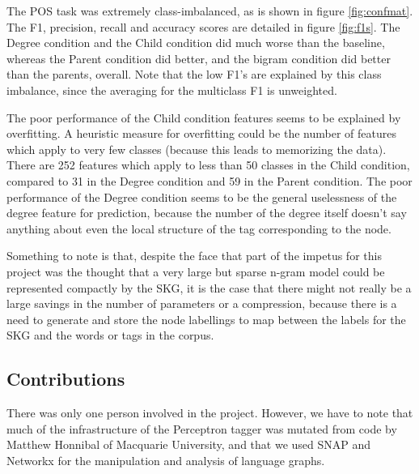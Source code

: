 \documentclass[12pt]{article}
\begin{document}
The POS task was extremely class-imbalanced, as is shown in figure \ref{fig:confmat}. The F1, precision, recall and accuracy scores are detailed in figure \ref{fig:f1s}. The Degree condition and the Child condition did much worse than the baseline, whereas the Parent condition did better, and the bigram condition did better than the parents, overall. Note that the low F1's are explained by this class imbalance, since the averaging for the multiclass F1 is unweighted.

The poor performance of the Child condition features seems to be explained by overfitting. A heuristic measure for overfitting could be the number of features which apply to very few classes (because this leads to memorizing the data). There are 252 features which apply to less than 50 classes in the Child condition, compared to 31 in the Degree condition and 59 in the Parent condition. The poor performance of the Degree condition seems to be the general uselessness of the degree feature for prediction, because the number of the degree itself doesn't say anything about even the local structure of the tag corresponding to the node.

Something to note is that, despite the face that part of the impetus for this project was the thought that a very large but sparse n-gram model could be represented compactly by the SKG, it is the case that there might not really be a large savings in the number of parameters or a compression, because there is a need to generate and store the node labellings to map between the labels for the SKG and the words or tags in the corpus.



\subsection*{Contributions}
There was only one person involved in the project. However, we have to note that much of the infrastructure of the Perceptron tagger was mutated from code by Matthew Honnibal of Macquarie University, and that we used SNAP and Networkx for the manipulation and analysis of language graphs. %
\end{document}
